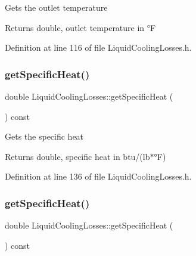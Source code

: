 Gets the outlet temperature

\begin{DoxyReturn}{Returns}
double, outlet temperature in °F 
\end{DoxyReturn}


Definition at line 116 of file Liquid\+Cooling\+Losses.\+h.

\mbox{\label{class_liquid_cooling_losses_aa60623b6f1fab605d25c9c24e8dd00ec}} 
\subsubsection{\texorpdfstring{get\+Specific\+Heat()}{getSpecificHeat()}\hspace{0.1cm}{\footnotesize\ttfamily [1/3]}}
{\footnotesize\ttfamily double Liquid\+Cooling\+Losses\+::get\+Specific\+Heat (\begin{DoxyParamCaption}{ }\end{DoxyParamCaption}) const\hspace{0.3cm}{\ttfamily [inline]}}

Gets the specific heat

\begin{DoxyReturn}{Returns}
double, specific heat in btu/(lb$\ast$°F) 
\end{DoxyReturn}


Definition at line 136 of file Liquid\+Cooling\+Losses.\+h.

\mbox{\label{class_liquid_cooling_losses_aa60623b6f1fab605d25c9c24e8dd00ec}} 
\subsubsection{\texorpdfstring{get\+Specific\+Heat()}{getSpecificHeat()}\hspace{0.1cm}{\footnotesize\ttfamily [2/3]}}
{\footnotesize\ttfamily double Liquid\+Cooling\+Losses\+::get\+Specific\+Heat (\begin{DoxyParamCaption}{ }\end{DoxyParamCaption}) const\hspace{0.3cm}{\ttfamily [inline]}}

